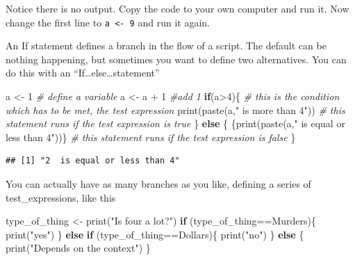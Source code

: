 \documentclass[
  12pt,
  a5paper,
]{book}
\newenvironment{Shaded}{\begin{snugshade}}{\end{snugshade}}
\newcommand{\CommentTok}[1]{\textcolor[rgb]{0.56,0.35,0.01}{\textit{#1}}}
\newcommand{\ControlFlowTok}[1]{\textcolor[rgb]{0.13,0.29,0.53}{\textbf{#1}}}
\newcommand{\DecValTok}[1]{\textcolor[rgb]{0.00,0.00,0.81}{#1}}
\newcommand{\FunctionTok}[1]{\textcolor[rgb]{0.00,0.00,0.00}{#1}}
\newcommand{\NormalTok}[1]{#1}
\newcommand{\OtherTok}[1]{\textcolor[rgb]{0.56,0.35,0.01}{#1}}
\newcommand{\SpecialCharTok}[1]{\textcolor[rgb]{0.00,0.00,0.00}{#1}}
\newcommand{\StringTok}[1]{\textcolor[rgb]{0.31,0.60,0.02}{#1}}
\begin{document}
Notice there is no output. Copy the code to your own computer and run it. Now change the first line to \texttt{a\ \textless{}-\ 9} and run it again.

An If statement defines a branch in the flow of a script. The default can be nothing happening, but sometimes you want to define two alternatives. You can do this with an ``If\ldots else\ldots statement''

\begin{Shaded}
\begin{Highlighting}[]
\NormalTok{a }\OtherTok{\textless{}{-}} \DecValTok{1} \CommentTok{\# define a variable}
\NormalTok{a }\OtherTok{\textless{}{-}}\NormalTok{ a }\SpecialCharTok{+} \DecValTok{1} \CommentTok{\#add 1}
\ControlFlowTok{if}\NormalTok{(a}\SpecialCharTok{\textgreater{}}\DecValTok{4}\NormalTok{)\{ }\CommentTok{\# this is the condition which has to be met, the \textquotesingle{}test expression\textquotesingle{}}
  \FunctionTok{print}\NormalTok{(}\FunctionTok{paste}\NormalTok{(a,}\StringTok{" is more than 4"}\NormalTok{)) }\CommentTok{\# this statement runs if the test expression is true}
\NormalTok{\} }\ControlFlowTok{else}\NormalTok{ \{}
\NormalTok{  \{}\FunctionTok{print}\NormalTok{(}\FunctionTok{paste}\NormalTok{(a,}\StringTok{" is equal or less than 4"}\NormalTok{))\} }\CommentTok{\# this statement runs if the test expression is false}
\NormalTok{\}}
\end{Highlighting}
\end{Shaded}

\begin{verbatim}
## [1] "2  is equal or less than 4"
\end{verbatim}

You can actually have as many branches as you like, defining a series of test\_expressions, like this

\begin{Shaded}
\begin{Highlighting}[]
\NormalTok{type\_of\_thing }\OtherTok{\textless{}{-}} \StringTok{\textquotesingle{}\textquotesingle{}} 
\FunctionTok{print}\NormalTok{(}\StringTok{"Is four a lot?"}\NormalTok{)}
\ControlFlowTok{if}\NormalTok{ (type\_of\_thing}\SpecialCharTok{==}\StringTok{\textquotesingle{}Murders\textquotesingle{}}\NormalTok{)\{}
  \FunctionTok{print}\NormalTok{(}\StringTok{"yes"}\NormalTok{)}
\NormalTok{\} }\ControlFlowTok{else} \ControlFlowTok{if}\NormalTok{ (type\_of\_thing}\SpecialCharTok{==}\StringTok{\textquotesingle{}Dollars\textquotesingle{}}\NormalTok{)\{}
  \FunctionTok{print}\NormalTok{(}\StringTok{"no"}\NormalTok{)}
\NormalTok{\} }\ControlFlowTok{else}\NormalTok{ \{}
  \FunctionTok{print}\NormalTok{(}\StringTok{"Depends on the context"}\NormalTok{)}
\NormalTok{\}}
\end{Highlighting}
\end{Shaded}
\end{document}
